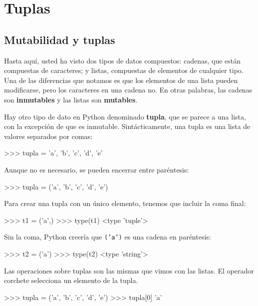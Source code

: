 
\chapter{Tuplas}

\label{tuplechap} 

\section{Mutabilidad y tuplas}

  

Hasta aquí, usted ha visto dos tipos de datos compuestos: cadenas,
que están compuestas de caracteres; y listas, compuestas de elementos
de cualquier tipo. Una de las diferencias que notamos es que los elementos
de una lista pueden modificarse, pero los caracteres en una cadena
no. En otras palabras, las cadenas son \textbf{inmutables} y las listas
son \textbf{mutables}.

 

Hay otro tipo de dato en Python denominado \textbf{tupla}, que se
parece a una lista, con la excepción de que es inmutable. Sintácticamente,
una tupla es una lista de valores separados por comas:
\begin{pyconcode}
>>> tupla = 'a', 'b', 'c', 'd', 'e'
\end{pyconcode}

Aunque no es necesario, se pueden encerrar entre paréntesis:
\begin{pyconcode}
>>> tupla = ('a', 'b', 'c', 'd', 'e')
\end{pyconcode}

Para crear una tupla con un único elemento, tenemos que incluir la
coma final:
\begin{pyconcode}
>>> t1 = ('a',)
>>> type(t1)
<type 'tuple'>
\end{pyconcode}

Sin la coma, Python creería que \texttt{('a')} es una cadena en paréntesis:
\begin{pyconcode}
>>> t2 = ('a')
>>> type(t2)
<type 'string'>
\end{pyconcode}

Las operaciones sobre tuplas son las mismas que vimos con las listas.
El operador corchete selecciona un elemento de la tupla.
\begin{pyconcode}
>>> tupla = ('a', 'b', 'c', 'd', 'e')
>>> tupla[0]
'a'
\end{pyconcode}

